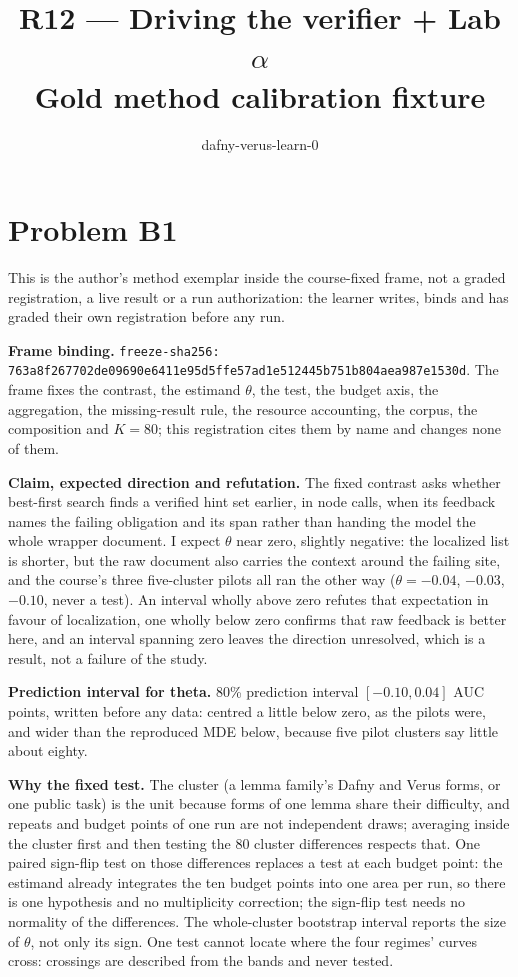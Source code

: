 \documentclass[11pt]{article}
\title{R12 --- Driving the verifier + Lab $\alpha$ \\ \large Gold method calibration fixture}
\author{dafny-verus-learn-0}
\date{}
\begin{document}
\maketitle
\sloppy
\section*{Problem B1}\label{ans:B1}
\begin{answer}
This is the author's method exemplar inside the course-fixed frame, not a graded
registration, a live result or a run authorization: the learner writes, binds and
has graded their own registration before any run.

\textbf{Frame binding.} \texttt{freeze-sha256: 763a8f267702de09690e6411e95d5ffe57ad1e512445b751b804aea987e1530d}. The frame fixes the
contrast, the estimand $\theta$, the test, the budget axis, the aggregation, the
missing-result rule, the resource accounting, the corpus, the composition and
$K = 80$; this registration cites them by name and changes none of them.

\textbf{Claim, expected direction and refutation.} The fixed contrast asks
whether best-first search finds a verified hint set earlier, in node calls, when
its feedback names the failing obligation and its span rather than handing the
model the whole wrapper document. I expect $\theta$ near zero, slightly negative:
the localized list is shorter, but the raw document also carries the context
around the failing site, and the course's three five-cluster pilots all ran the
other way ($\theta = -0.04$, $-0.03$, $-0.10$, never a test). An interval wholly
above zero refutes that expectation in favour of localization, one wholly below
zero confirms that raw feedback is better here, and an interval spanning zero
leaves the direction unresolved, which is a result, not a failure of the study.

\textbf{Prediction interval for theta.} 80\% prediction interval
$[-0.10, 0.04]$ AUC points, written before any data: centred a little below
zero, as the pilots were, and wider than the reproduced MDE below, because five
pilot clusters say little about eighty.

\textbf{Why the fixed test.} The cluster (a lemma family's Dafny and Verus forms,
or one public task) is the unit because forms of one lemma share their
difficulty, and repeats and budget points of one run are not independent draws;
averaging inside the cluster first and then testing the 80 cluster differences
respects that. One paired sign-flip test on those differences replaces a test at
each budget point: the estimand already integrates the ten budget points into one
area per run, so there is one hypothesis and no multiplicity correction; the
sign-flip test needs no normality of the differences. The whole-cluster bootstrap
interval reports the size of $\theta$, not only its sign. One test cannot locate
where the four regimes' curves cross: crossings are described from the bands and
never tested.


\end{answer}
\end{document}
